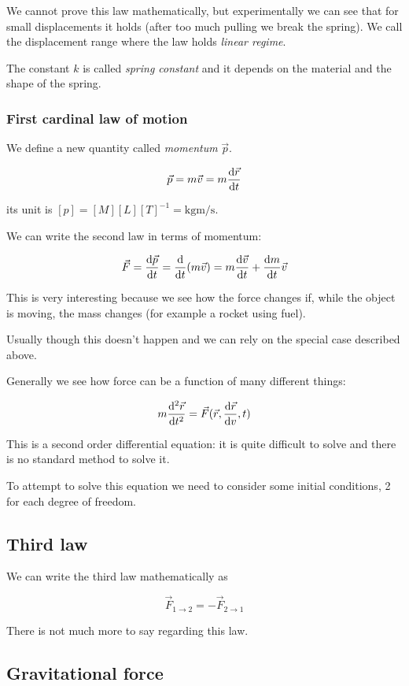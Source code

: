 \documentclass[10pt]{extarticle}
\begin{document}
We cannot prove this law mathematically, but experimentally we can see that for small displacements it holds (after too much pulling we break the spring).
We call the displacement range where the law holds \textit{linear regime}.

The constant $k$ is called \textit{spring constant} and it depends on the material and the shape of the spring.

\subsubsection{First cardinal law of motion}

We define a new quantity called \textit{momentum} $\vec p$.

$$
    \vec p = m \vec v = m \dv{\vec r}{t}
$$

its unit is $[p] = [M][L][T]^{-1} = \si{\kilogram \meter \per \second}$.

We can write the second law in terms of momentum:

$$
    \vec F = \dv{\vec p}{t} = \dv{t} (m \vec v) = m \dv{\vec v}{t} + \dv{m}{t} \vec v
$$

This is very interesting because we see how the force changes if, while the object is moving, the mass changes (for example a rocket using fuel).

Usually though this doesn't happen and we can rely on the special case described above.

Generally we see how force can be a function of many different things:

$$
    m \dv[2]{\vec r}{t} = \vec F(\vec r, \dv{\vec r}{v}, t)
$$

This is a second order differential equation: it is quite difficult to solve and there is no standard method to solve it.

To attempt to solve this equation we need to consider some initial conditions, 2 for each degree of freedom.

\subsection{Third law}

We can write the third law mathematically as

$$
    \vec{F}_{1 \to 2} = - \vec{F}_{2 \to 1}
$$

There is not much more to say regarding this law.

\subsection{Gravitational force}
\end{document}
